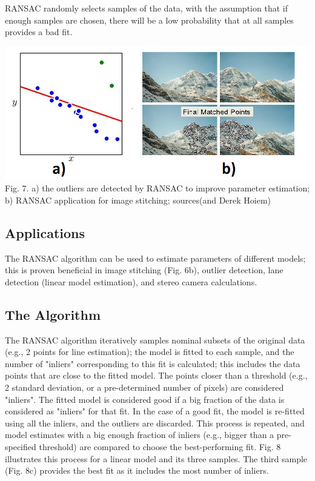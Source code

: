 \documentclass{article}
\begin{document}
RANSAC randomly selects samples of the data, with the assumption that if enough samples are chosen, there will be a low probability that at all samples provides a bad fit.

\includegraphics[width=\textwidth]{ransac1.png}
Fig. 7. a) the outliers are detected by RANSAC to improve parameter estimation; b) RANSAC application for image stitching; sources(\cite{prince2012computer}and Derek Hoiem)

\subsection{Applications}
The RANSAC algorithm can be used to estimate parameters of different models; this is proven beneficial in image stitching (Fig. 6b), outlier detection, lane detection (linear model estimation), and stereo camera calculations.

\subsection{The Algorithm}
The RANSAC algorithm iteratively samples nominal subsets of the original data (e.g., 2 points for line estimation); the model is fitted to each sample, and the number of "inliers" corresponding to this fit is calculated; this includes the data points that are close to the fitted model. The points closer than a threshold (e.g., 2 standard deviation, or a pre-determined number of pixels) are considered "inliers". The fitted model is considered good if a big fraction of the data is considered as "inliers" for that fit. In the case of a good fit, the model is re-fitted using all the inliers, and the outliers are discarded. This process is repeated, and model estimates with a big enough fraction of inliers (e.g., bigger than a pre-specified threshold) are compared to choose the best-performing fit. Fig. 8 illustrates this process for a linear model and its three samples. The third sample (Fig. 8c) provides the best fit as it includes the most number of inliers.
\end{document}
